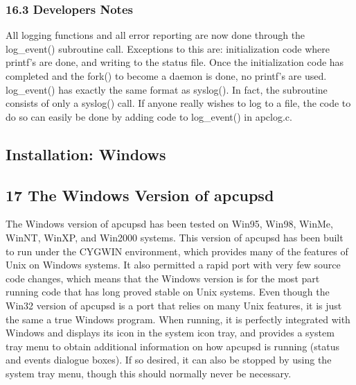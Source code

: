 {{{{{{{{{{\subsubsection*{16.3 Developers Notes}

\label{index-Developers-Notes-169}
All logging functions and all error reporting are now done through the
log\_event() subroutine call. Exceptions to this are: initialization code
where printf's are done, and writing to the status file. Once the
initialization code has completed and the fork() to become a daemon is done,
no printf's are used. log\_event() has exactly the same format as syslog(). In
fact, the subroutine consists of only a syslog() call. If anyone really wishes
to log to a file, the code to do so can easily be done by adding code to
log\_event() in apclog.c. 

\label{Installation-on-Windows}

\subsection*{Installation: Windows}

\label{index-Installation_002c-Windows-170}
\label{index-Windows_002c-Installation-171}

\label{The-Windows-Version-of-apcupsd}

\subsection*{17 The Windows Version of apcupsd}

The Windows version of apcupsd has been tested on Win95, Win98, WinMe, WinNT,
WinXP, and Win2000 systems. This version of apcupsd has been built to run
under the CYGWIN environment, which provides many of the features of Unix on
Windows systems. It also permitted a rapid port with very few source code
changes, which means that the Windows version is for the most part running
code that has long proved stable on Unix systems. Even though the Win32
version of apcupsd is a port that relies on many Unix features, it is just the
same a true Windows program. When running, it is perfectly integrated with
Windows and displays its icon in the system icon tray, and provides a system
tray menu to obtain additional information on how apcupsd is running (status
and events dialogue boxes). If so desired, it can also be stopped by using the
system tray menu, though this should normally never be necessary.  

}}}}}}}}}}
